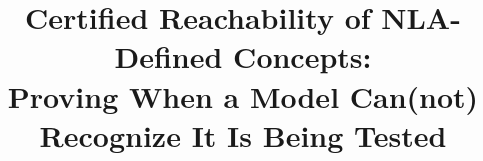 \documentclass[11pt]{article}
\title{\textbf{Certified Reachability of NLA-Defined Concepts:\\
Proving When a Model Can(not) Recognize It Is Being Tested}}
\author{}
\date{}
\begin{document}
\maketitle

\begin{abstract}

\end{abstract}










\end{document}

